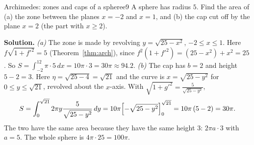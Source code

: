 \documentclass[11pt]{article}
\begin{document}
\begin{exmp}{Archimedes: zones and caps of a sphere}{e9}
A sphere has radius $5$. Find the area of (a) the zone between the planes $x=-2$ and $x=1$, and (b) the cap cut off by the plane $x=2$ (the part with $x\ge2$).

\textbf{Solution.} \emph{(a)} The zone is made by revolving $y=\sqrt{25-x^2}$, $-2\le x\le1$. Here $f\sqrt{1+f'^2}=5$ (Theorem~\ref{thm:arch}), since $f^2(1+f'^2)=(25-x^2)+x^2=25$. So $S=\int_{-2}^12\pi\cdot5\,dx=10\pi\cdot3=30\pi\approx94.2$.
\emph{(b)} The cap has $b=2$ and height $5-2=3$. Here $\eta=\sqrt{25-4}=\sqrt{21}$ and the curve is $x=\sqrt{25-y^2}$ for $0\le y\le\sqrt{21}$, revolved about the $x$-axis. With $\sqrt{1+g'^2}=\frac5{\sqrt{25-y^2}}$,
\[
S=\int_0^{\sqrt{21}}2\pi y\frac5{\sqrt{25-y^2}}\,dy=10\pi\Bigl[-\sqrt{25-y^2}\Bigr]_0^{\sqrt{21}}=10\pi\,(5-2)=30\pi .
\]
The two have the same area because they have the same height $3$: $2\pi a\cdot3$ with $a=5$. The whole sphere is $4\pi\cdot25=100\pi$.


\end{exmp}
\end{document}
